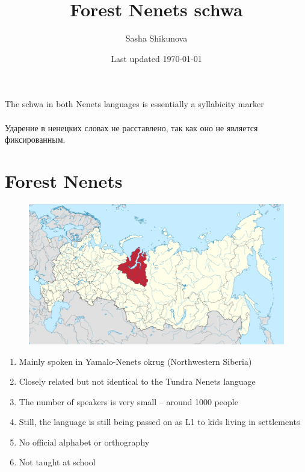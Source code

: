 \documentclass[a4paper, 12pt]{article}
\title{Forest Nenets schwa}
\author{Sasha Shikunova}
\date{Last updated \today}
\begin{document}
\maketitle

\begin{flushright} 
The schwa in both Nenets languages is essentially a syllabicity marker\\\parencite[p. 358]{salminen2007}\\

\noindent Ударение в ненецких словах не расставлено, так как оно не является фиксированным. \\\parencite[p. 8]{barmich-vello}
\end{flushright}

		\section{Forest Nenets}
		
	\begin{figure}[H]
		\centering
		\includegraphics[scale=.3]{yanao-map}
	\end{figure}
		
	\begin{enumerate}[$\gg$]
		\item Mainly spoken in Yamalo-Nenets okrug (Northwestern Siberia)
		\item Closely related but not identical to the Tundra Nenets language
		\item The number of speakers is very small -- around 1000 people
		\item Still, the language is still being passed on as L1 to kids living in settlements
		\item No official alphabet or orthography
		\item Not taught at school
	\end{enumerate}
	
\end{document}
